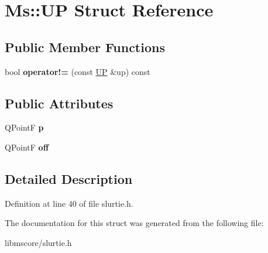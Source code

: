 \hypertarget{struct_ms_1_1_u_p}{}\section{Ms\+:\+:UP Struct Reference}
\label{struct_ms_1_1_u_p}
\subsection*{Public Member Functions}
\begin{DoxyCompactItemize}
\item 
\mbox{\label{struct_ms_1_1_u_p_a4f508c73aacac1333ab2710aebeb88a6}} 
bool {\bfseries operator!=} (const \hyperlink{struct_ms_1_1_u_p}{UP} \&up) const
\end{DoxyCompactItemize}
\subsection*{Public Attributes}
\begin{DoxyCompactItemize}
\item 
\mbox{\label{struct_ms_1_1_u_p_a83a93a725e76c8e8fc971de52dbb66cf}} 
Q\+PointF {\bfseries p}
\item 
\mbox{\label{struct_ms_1_1_u_p_a628426fdf05955dbd74fe12019bc7a87}} 
Q\+PointF {\bfseries off}
\end{DoxyCompactItemize}


\subsection{Detailed Description}


Definition at line 40 of file slurtie.\+h.



The documentation for this struct was generated from the following file\+:\begin{DoxyCompactItemize}
\item 
libmscore/slurtie.\+h\end{DoxyCompactItemize}
